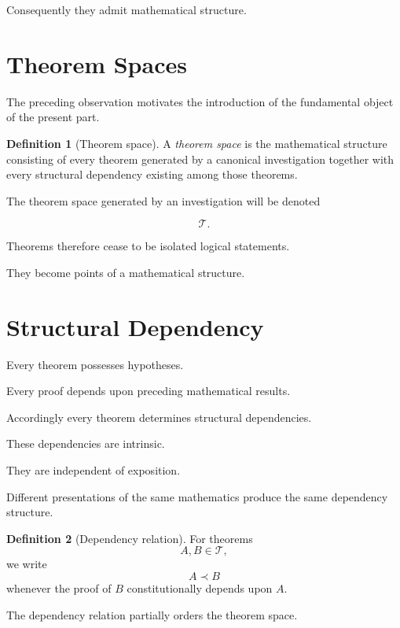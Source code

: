 \documentclass[13pt,openany]{book}
\theoremstyle{plain}
\theoremstyle{definition}
\newtheorem{definition}{Definition}[chapter]
\begin{document}
Consequently they admit mathematical structure.

\section{Theorem Spaces}

The preceding observation motivates the introduction of the fundamental object
of the present part.

\begin{definition}[Theorem space]
A \emph{theorem space} is the mathematical structure consisting of every
theorem generated by a canonical investigation together with every structural
dependency existing among those theorems.
\end{definition}

The theorem space generated by an investigation will be denoted

\[
\mathcal T.
\]

Theorems therefore cease to be isolated logical statements.

They become points of a mathematical structure.

\section{Structural Dependency}

Every theorem possesses hypotheses.

Every proof depends upon preceding mathematical results.

Accordingly every theorem determines structural dependencies.

These dependencies are intrinsic.

They are independent of exposition.

Different presentations of the same mathematics produce the same dependency
structure.

\begin{definition}[Dependency relation]
For theorems
\[
A,B\in\mathcal T,
\]
we write
\[
A\prec B
\]
whenever the proof of \(B\) constitutionally depends upon \(A\).
\end{definition}

The dependency relation partially orders the theorem space.
\end{document}
